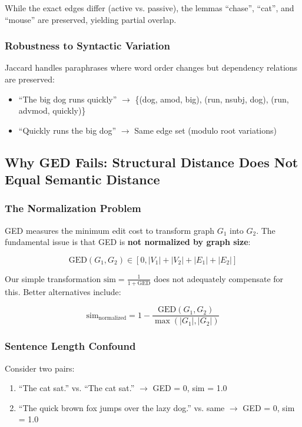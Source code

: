 \documentclass[11pt,a4paper]{article}
\begin{document}
While the exact edges differ (active vs. passive), the lemmas ``chase'', ``cat'', and ``mouse'' are preserved, yielding partial overlap.

\subsubsection{Robustness to Syntactic Variation}

Jaccard handles paraphrases where word order changes but dependency relations are preserved:
\begin{itemize}
    \item ``The big dog runs quickly'' $\to$ \{(dog, amod, big), (run, nsubj, dog), (run, advmod, quickly)\}
    \item ``Quickly runs the big dog'' $\to$ Same edge set (modulo root variations)
\end{itemize}

\subsection{Why GED Fails: Structural Distance Does Not Equal Semantic Distance}

\subsubsection{The Normalization Problem}

GED measures the minimum edit cost to transform graph $G_1$ into $G_2$. The fundamental issue is that GED is \textbf{not normalized by graph size}:

\begin{equation}
\text{GED}(G_1, G_2) \in [0, |V_1| + |V_2| + |E_1| + |E_2|]
\end{equation}

Our simple transformation $\text{sim} = \frac{1}{1 + \text{GED}}$ does not adequately compensate for this. Better alternatives include:

\begin{equation}
\text{sim}_{\text{normalized}} = 1 - \frac{\text{GED}(G_1, G_2)}{\max(|G_1|, |G_2|)}
\end{equation}

\subsubsection{Sentence Length Confound}

Consider two pairs:
\begin{enumerate}
    \item ``The cat sat.'' vs. ``The cat sat.'' $\to$ GED = 0, sim = 1.0
    \item ``The quick brown fox jumps over the lazy dog.'' vs. same $\to$ GED = 0, sim = 1.0
\end{enumerate}
\end{document}
